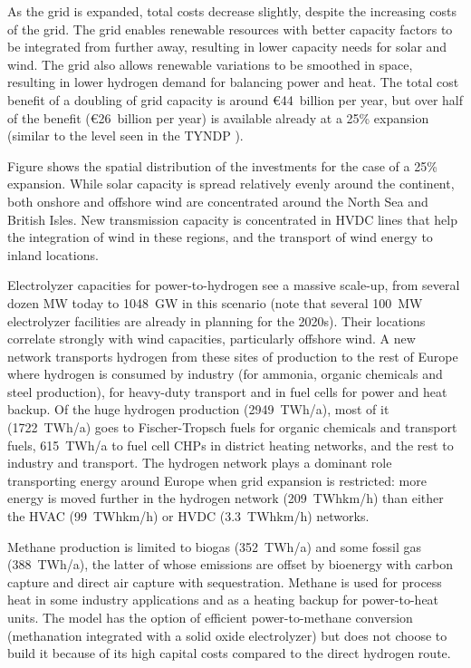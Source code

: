 As the grid is expanded, total costs decrease
slightly, despite the increasing costs of the grid. The grid enables
renewable resources with better capacity factors to be integrated from
further away, resulting in lower capacity needs for solar and
wind. The grid also allows renewable variations to be smoothed in space,
resulting in lower hydrogen demand for balancing power and heat.  The
total cost benefit of a doubling of grid capacity is around
\euro44~billion per year, but over half of the benefit (\euro26~billion per year) is available already at a 25\% expansion (similar to the level seen in the TYNDP \cite{TYNDP2016}).

Figure shows the spatial distribution of the investments
for the case of a 25\% expansion. While solar capacity is spread
relatively evenly around the continent, both onshore and offshore wind
are concentrated around the North Sea and British Isles. New
transmission capacity is concentrated in HVDC lines that help the
integration of wind in these regions, and the transport of wind energy
to inland locations.

Electrolyzer capacities for power-to-hydrogen see a massive scale-up,
from several dozen MW today to 1048~GW in this scenario (note that
several 100~MW electrolyzer facilities are already in planning for the
2020s). Their locations correlate strongly with wind capacities,
particularly offshore wind. A new network
transports hydrogen from these sites of production to the rest of
Europe where hydrogen is consumed by industry (for ammonia, organic
chemicals and steel production), for heavy-duty transport and in fuel
cells for power and heat backup. Of the huge hydrogen production
(2949~TWh/a), most of it (1722~TWh/a) goes to Fischer-Tropsch fuels
for organic chemicals and transport fuels, 615~TWh/a to fuel cell CHPs
in district heating networks, and the rest to industry and transport.
The hydrogen network plays a dominant role transporting energy around
Europe when grid expansion is restricted: more energy is moved further
in the hydrogen network (209~TWhkm/h) than either the HVAC
(99~TWhkm/h) or HVDC (3.3~TWhkm/h) networks.

Methane production is limited to biogas (352~TWh/a) and some fossil
gas (388~TWh/a), the latter of whose emissions are offset by bioenergy
with carbon capture and direct air capture with sequestration.
Methane is used for process heat in some industry applications and as
a heating backup for power-to-heat units. The model has the option of
efficient power-to-methane conversion (methanation integrated with a
solid oxide electrolyzer) but does not choose to build it because of
its high capital costs compared to the direct hydrogen route.

